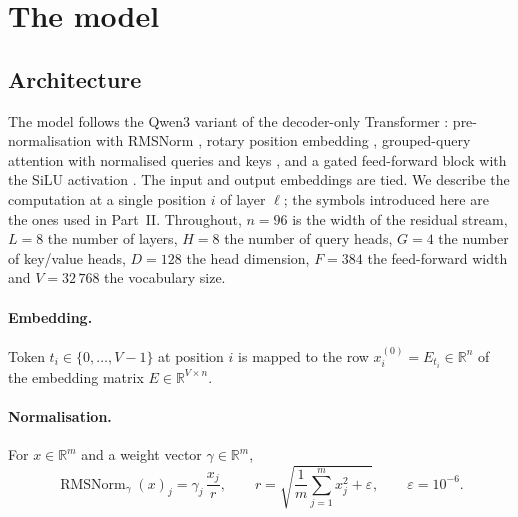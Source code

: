 \documentclass[a4paper,10pt]{article}
\newcommand{\RMS}{\operatorname{RMSNorm}}
\newcommand{\R}{\mathbb{R}}
\begin{document}
\section{The model}
\label{sec:model}

\subsection{Architecture}

The model follows the Qwen3 variant \citep{yang2025qwen3} of the decoder-only Transformer \citep{vaswani2017attention}: pre-normalisation with RMSNorm \citep{zhang2019rmsnorm}, rotary position embedding \citep{su2024roformer}, grouped-query attention \citep{ainslie2023gqa} with normalised queries and keys \citep{henry2020qknorm}, and a gated feed-forward block with the SiLU activation \citep{shazeer2020glu,elfwing2018silu}.
The input and output embeddings are tied.
We describe the computation at a single position $i$ of layer $\ell$; the symbols introduced here are the ones used in Part~II.
Throughout, $n=96$ is the width of the residual stream, $L=8$ the number of layers, $H=8$ the number of query heads, $G=4$ the number of key/value heads, $D=128$ the head dimension, $F=384$ the feed-forward width and $V=32\,768$ the vocabulary size.

\paragraph{Embedding.}
Token $t_i\in\{0,\dots,V-1\}$ at position $i$ is mapped to the row $x^{(0)}_i = E_{t_i}\in\R^{n}$ of the embedding matrix $E\in\R^{V\times n}$.

\paragraph{Normalisation.}
For $x\in\R^{m}$ and a weight vector $\gamma\in\R^{m}$,
\begin{equation}
\RMS_\gamma(x)_j = \gamma_j\,\frac{x_j}{r},\qquad r=\sqrt{\frac1m\sum_{j=1}^{m}x_j^2+\varepsilon},\qquad \varepsilon=10^{-6}.
\end{equation}
\end{document}

